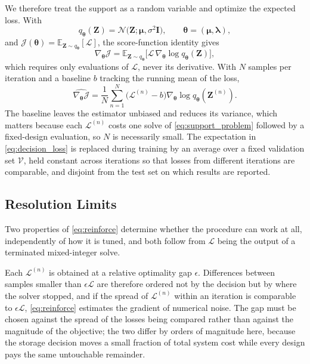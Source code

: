 We therefore treat the support as a random variable and optimize the
expected loss. With
\begin{equation}
q_{\boldsymbol{\theta}}(\boldsymbol{Z})
=
\mathcal{N}\bigl(\boldsymbol{Z};\boldsymbol{\mu},\sigma^2\boldsymbol{I}\bigr),
\qquad
\boldsymbol{\theta}=(\boldsymbol{\mu},\boldsymbol{\lambda}),
\label{eq:policy}
\end{equation}
and $\mathcal{J}(\boldsymbol{\theta})=
\mathbb{E}_{\boldsymbol{Z}\sim q_{\boldsymbol{\theta}}}[\mathcal{L}]$,
the score-function identity gives
\begin{equation}
\nabla_{\boldsymbol{\theta}}\mathcal{J}
=
\mathbb{E}_{\boldsymbol{Z}\sim q_{\boldsymbol{\theta}}}
\bigl[
\mathcal{L}\,
\nabla_{\boldsymbol{\theta}}\log q_{\boldsymbol{\theta}}(\boldsymbol{Z})
\bigr],
\label{eq:score_function}
\end{equation}
which requires only evaluations of $\mathcal{L}$, never its derivative.
With $N$ samples per iteration and a baseline $b$ tracking the running
mean of the loss,
\begin{equation}
\widehat{\nabla_{\boldsymbol{\theta}}\mathcal{J}}
=
\frac{1}{N}\sum_{n=1}^{N}
\bigl(\mathcal{L}^{(n)}-b\bigr)
\nabla_{\boldsymbol{\theta}}
\log q_{\boldsymbol{\theta}}(\boldsymbol{Z}^{(n)}).
\label{eq:reinforce}
\end{equation}
The baseline leaves the estimator unbiased and reduces its variance,
which matters because each $\mathcal{L}^{(n)}$ costs one solve of
\eqref{eq:support_problem} followed by a fixed-design evaluation, so $N$
is necessarily small. The expectation in \eqref{eq:decision_loss} is
replaced during training by an average over a fixed validation set
$\mathcal{V}$, held constant across iterations so that losses from
different iterations are comparable, and disjoint from the test set on
which results are reported.

\subsection{Resolution Limits}
\label{sec:resolution}

Two properties of \eqref{eq:reinforce} determine whether the procedure
can work at all, independently of how it is tuned, and both follow from
$\mathcal{L}$ being the output of a terminated mixed-integer solve.

Each $\mathcal{L}^{(n)}$ is obtained at a relative optimality gap
$\epsilon$. Differences between samples smaller than
$\epsilon\mathcal{L}$ are therefore ordered not by the decision but by
where the solver stopped, and if the spread of $\mathcal{L}^{(n)}$ within
an iteration is comparable to $\epsilon\mathcal{L}$, \eqref{eq:reinforce}
estimates the gradient of numerical noise. The gap must be chosen against
the spread of the losses being compared rather than against the magnitude
of the objective; the two differ by orders of magnitude here, because the
storage decision moves a small fraction of total system cost while every
design pays the same untouchable remainder.

